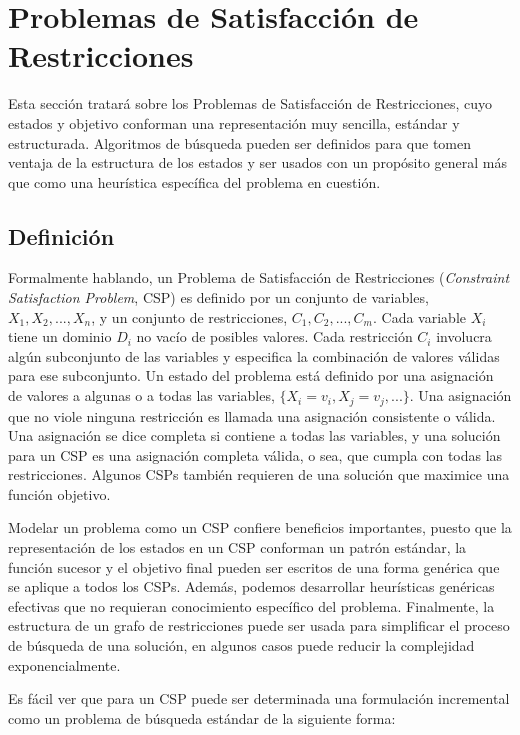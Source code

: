 \chapter{Problemas de Satisfacción de Restricciones}

Esta sección tratará sobre los Problemas de Satisfacción de Restricciones, cuyo estados y objetivo conforman una representación muy sencilla, estándar y estructurada. Algoritmos de búsqueda pueden ser definidos para que tomen ventaja de la estructura de los estados y ser usados con un propósito general más que como una heurística específica del problema en cuestión.

\section{Definición}

Formalmente hablando, un Problema de Satisfacción de Restricciones (\emph{Constraint Satisfaction Problem}, CSP) es definido por un conjunto de variables, $X_{1},X_{2},...,X_{n}$, y un conjunto de restricciones, $C_{1},C_{2},...,C_{m}$. Cada variable $X_{i}$ tiene un dominio $D_{i}$ no vac\'io de posibles valores. Cada restricción $C_{i}$ involucra algún subconjunto de las variables y especifica la combinación de valores válidas para ese subconjunto. Un estado del problema está definido por una asignación de valores a algunas o a todas las variables, $\{X_{i}=v_{i}, X_{j}=v_{j}, ...\}$. Una asignación que no viole ninguna restricción es llamada una asignación consistente o válida. Una asignación se dice completa si contiene a todas las variables, y una solución para un CSP es una asignación completa válida, o sea, que cumpla con todas las restricciones. Algunos CSPs tambi\'en requieren de una solución que maximice una función objetivo.

Modelar un problema como un CSP confiere beneficios importantes, puesto que la representación de los estados en un CSP
conforman un patrón estándar, la función sucesor y el objetivo final pueden ser escritos de una forma gen\'erica que se aplique a todos los CSPs. Adem\'as, podemos desarrollar heur\'isticas gen\'ericas efectivas que no requieran conocimiento espec\'ifico del problema. Finalmente, la estructura de un grafo de restricciones puede ser usada para simplificar el proceso de búsqueda de una solución, en algunos casos puede reducir la complejidad exponencialmente.

Es f\'acil ver que para un CSP puede ser determinada una formulaci\'on incremental como un problema de búsqueda est\'andar de la siguiente forma:

